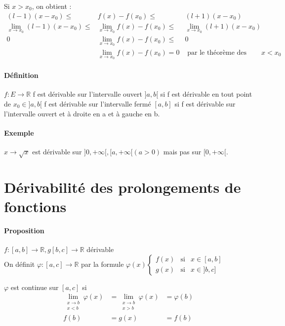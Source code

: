 	Si $x > x_0$, on obtient : \[ \begin{array}{rcl}
			(l-1)(x-x_0) \leq & f(x) - f(x_0) \leq & (l+1)(x-x_0) \\
			\lim_{x \to x_0} (l-1)(x-x_0) \leq & \lim_{x \to x_0}f(x) - f(x_0) \leq & \lim_{x \to x_0}(l+1)(x-x_0) \\
			0 & \lim_{x \to x_0}f(x) - f(x_0) \leq & 0 \\
			  & \lim_{x \to x_0}f(x) - f(x_0) = 0 & \text{ par le théorème des gendarmes, et de même pour } x < x_0 \end{array} \]


\paragraph{Définition} $f:E \rightarrow \mathbb{R}$ 
f est dérivable sur l'intervalle ouvert $]a, b[$ si f est dérivable en tout point de $x_0 \in ]a, b[$
f est dérivable sur l'intervalle fermé $[a, b]$ si f est dérivable sur l'intervalle ouvert et à droite en a et à gauche en b.

\paragraph{Exemple} $x \to \sqrt{x}$ est dérivable sur $]0, +\infty[, [a, +\infty[ (a > 0)$ mais pas sur $[0, +\infty[$.

\section{Dérivabilité des prolongements de fonctions}
\paragraph{Proposition} $f:[a, b] \rightarrow \mathbb{R}, g [b, c] \rightarrow \mathbb{R}$ dérivable ~\\
On définit $\varphi : [a, c] \rightarrow \mathbb{R}$ par la formule $\varphi(x) \left\{ \begin{array}{rcl}
		f(x) & \text{si} & x \in [a, b] \\
		g(x) & \text{si} & x \in ]b, c] 
	\end{array}
	\right.$

	$\varphi $ est continue sur $[a, c]$ si \[\begin{array}{rcl} 
		\lim_{\substack{x \to b \\ x < b}}\varphi (x) &= \lim_{\substack{x \to b \\ x > b}}\varphi (x) &= \varphi(b) \\
		f(b) &= g(x) & = f(b) 
	\end{array}\]

